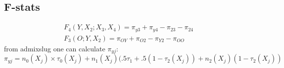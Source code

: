 \documentclass[10pt,a4paper]{article}
\begin{document}
\subsection*{F-stats}
\begin{align}
F_4(Y, X_2; X_3, X_4) = \pi_{y3} +\pi_{y4} - \pi_{23} - \pi_{24}\\
F_3(O; Y, X_2) = \pi_{OY} +\pi_{O2} - \pi_{Y2} - \pi_{OO}
\end{align}
from admixslug one can calculate $\pi_{yj}$:
$$\pi_{yj} = n_0(X_j) \times \tau_0(X_j) + n_1(X_j)(.5 \tau_1 + .5(1-\tau_2(X_j)) + n_2(X_j)(1-\tau_2(X_j))$$



\end{document}
